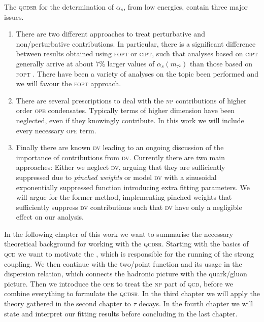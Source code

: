 \documentclass[../../index.tex]{subfiles}
\begin{document}
The \textsc{qcdsr} for the determination of \(\alpha_s\), from low energies,
contain three major issues.
\begin{enumerate}
\item There are two different approaches to treat perturbative and
  non\-/perturbative contributions. In particular, there is a significant
  difference between results obtained using \textsc{fopt} or \textsc{cipt}, such
  that analyses based on \textsc{cipt} generally arrive at about \(7\%\) larger
  values of \(\alpha_s(m_{\tau^2})\) than those based on \textsc{fopt}
  \cite{PDG2018}. There have been a variety of analyses on the topic been
  performed \cite{Pich2013,Caprini2009,Jamin2005} and we will favour the
  \textsc{fopt} approach.
\item There are several prescriptions to deal with the \textsc{np} contributions
  of higher order \textsc{ope} condensates. Typically terms of higher dimension
  have been neglected, even if they knowingly contribute. In this work we will
  include every necessary \textsc{ope} term.

\item Finally there are known \textsc{dv} leading to an ongoing discussion of
  the importance of contributions from \textsc{dv}. Currently there are two main
  approaches: Either we neglect \textsc{dv}, arguing that they are sufficiently
  suppressed due to \textit{pinched weights} \cite{Pich2016} or model
  \textsc{dv} with a sinusoidal exponentially suppressed function
  \cite{Cata2008,Boito2011a,Boito2014} introducing extra fitting parameters. We
  will argue for the former method, implementing pinched weights that
  sufficiently suppress \textsc{dv} contributions such that \textsc{dv} have
  only a negligible effect on our analysis.
\end{enumerate}

In the following chapter of this work we want to summarise the necessary
theoretical background for working with the \textsc{qcdsr}. Starting with the
basics of \textsc{qcd} we want to motivate the , which is responsible for the running of the strong coupling.
We then continue with the two\-/point function and its usage in the dispersion
relation, which connects the hadronic picture with the quark\-/gluon picture.
Then we introduce the \textsc{ope} to treat the \textsc{np} part of
\textsc{qcd}, before we combine everything to formulate the \textsc{qcdsr}. In the
third chapter we will apply the theory gathered in the second chapter
to \(\tau\) decays. In the fourth chapter we will state and interpret our
fitting results before concluding in the last chapter.
\end{document}
